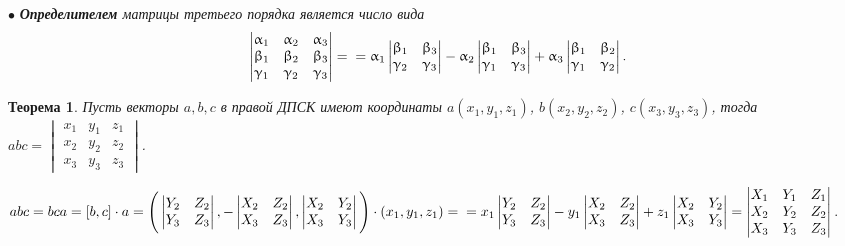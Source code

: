 $\bullet$ \textit{\textbf{Определителем} матрицы третьего порядка является число вида} $$\begin{vmatrix} \alpha_1 & \alpha_2 & \alpha_3 \\ 
	\beta_1 & \beta_2 & \beta_3 \\ \gamma_1 & \gamma_2 & \gamma_3 \end{vmatrix} = \\ = \alpha_1 \begin{vmatrix} \beta_1 & \beta_3 \\ \gamma_2 & \gamma_3 \end{vmatrix} - \alpha_2 \begin{vmatrix} \beta_1 & \beta_3 \\ \gamma_1 & \gamma_3 \end{vmatrix} + \alpha_3 \begin{vmatrix} \beta_1 & \beta_2 \\ \gamma_1 & \gamma_2 \end{vmatrix}.$$
\newtheorem*{t3_6_2}{Теорема}\begin{t3_6_2}
	Пусть векторы $a, b, c$ в правой ДПСК имеют координаты $a(x_1, y_1, z_1)$, $b(x_2, y_2, z_2)$, $c(x_3, y_3, z_3)$, тогда $abc = \begin{vmatrix} x_1 & y_1 & z_1 \\ x_2 & y_2 & z_2 \\ x_3 & y_3 & z_3 \end{vmatrix}$. \end{t3_6_2}
\begin{Proof}
	$abc = bca = [b, c] \cdot a = \Bigg( \begin{vmatrix} Y_2 & Z_2 \\ Y_3 & Z_3 \end{vmatrix}, - \begin{vmatrix} X_2 & Z_2 \\ X_3 & Z_3 \end{vmatrix}, \begin{vmatrix} X_2 & Y_2 \\ X_3 & Y_3 \end{vmatrix} \Bigg) \cdot (x_1, y_1, z_1) = \\ = x_1 \begin{vmatrix} Y_2 & Z_2 \\ Y_3 & Z_3 \end{vmatrix} - y_1 \begin{vmatrix} X_2 & Z_2 \\ X_3 & Z_3 \end{vmatrix} + z_1 \begin{vmatrix} X_2 & Y_2 \\ X_3 & Y_3 \end{vmatrix} = \begin{vmatrix} X_1 & Y_1 & Z_1 \\ X_2 & Y_2 & Z_2 \\ X_3 & Y_3 & Z_3 \end{vmatrix}$.
\end{Proof}





